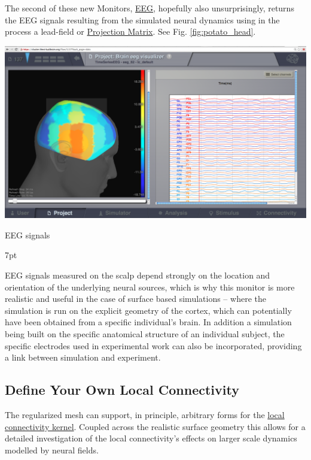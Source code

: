 \documentclass{tufte-handout}
\newenvironment{blah}{%
  \def\FrameCommand{%
    \hspace{1pt}%
    {\color{DarkOrange}\vrule width 2pt}%
    {\color{PeachPuff}\vrule width 4pt}%
    \colorbox{PeachPuff}%
  }%
  \MakeFramed{\advance\hsize-\width\FrameRestore}%
  \noindent\hspace{-4.55pt}%
  \begin{adjustwidth}{}{7pt}%
  \vspace{2pt}\vspace{2pt}%
}
{%
  \vspace{2pt}\end{adjustwidth}\endMakeFramed%
}
\begin{document}
The second of these new Monitors, \underline{EEG}, hopefully also
unsurprisingly, returns the EEG signals resulting from the simulated neural
dynamics using in the process a lead-field or \underline{Projection Matrix}.  See Fig. \ref{fig:potato_head}.
\begin{marginfigure}
  \includegraphics[width=\linewidth]{Handout_UI_BuildingYourOwnBrainNetworkModel_DefaultLocalConnectivityPotatoHead}%
  \caption{EEG signals}%
  \label{fig:potato_head}%
\end{marginfigure}

\begin{blah}
EEG signals measured on the scalp depend strongly on the location
and orientation of the underlying neural sources, which is why this monitor is
more realistic and useful in the case of surface based simulations -- where
the simulation is run on the explicit geometry of the cortex, which can
potentially have been obtained from a specific individual's brain. 
In addition a simulation being built on the specific anatomical structure of an individual
subject, the specific electrodes used in experimental work can also be
incorporated, providing a link between simulation and
experiment. 
\end{blah}

\subsection{Define Your Own Local Connectivity}\label{sec:local_connectivity}

The regularized mesh can support, in principle, arbitrary forms for the
\underline{local connectivity kernel}. Coupled across the realistic surface geometry this
allows for a detailed investigation of the local connectivity's effects on
larger scale dynamics modelled by neural fields.
\end{document}
